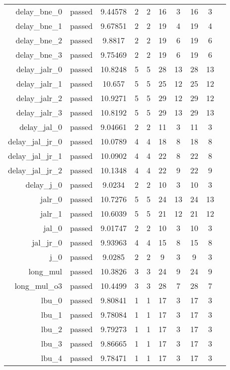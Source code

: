 \begin{longtable}{r|ccccccccc}
    delay\_bne\_0 & passed & 9.44578 & 2 & 2 & 16 & 3 & 16 & 3 \\
    delay\_bne\_1 & passed & 9.67851 & 2 & 2 & 19 & 4 & 19 & 4 \\
    delay\_bne\_2 & passed & 9.8817 & 2 & 2 & 19 & 6 & 19 & 6 \\
    delay\_bne\_3 & passed & 9.75469 & 2 & 2 & 19 & 6 & 19 & 6 \\
    delay\_jalr\_0 & passed & 10.8248 & 5 & 5 & 28 & 13 & 28 & 13 \\
    delay\_jalr\_1 & passed & 10.657 & 5 & 5 & 25 & 12 & 25 & 12 \\
    delay\_jalr\_2 & passed & 10.9271 & 5 & 5 & 29 & 12 & 29 & 12 \\
    delay\_jalr\_3 & passed & 10.8192 & 5 & 5 & 29 & 13 & 29 & 13 \\
    delay\_jal\_0 & passed & 9.04661 & 2 & 2 & 11 & 3 & 11 & 3 \\
    delay\_jal\_jr\_0 & passed & 10.0789 & 4 & 4 & 18 & 8 & 18 & 8 \\
    delay\_jal\_jr\_1 & passed & 10.0902 & 4 & 4 & 22 & 8 & 22 & 8 \\
    delay\_jal\_jr\_2 & passed & 10.1348 & 4 & 4 & 22 & 9 & 22 & 9 \\
    delay\_j\_0 & passed & 9.0234 & 2 & 2 & 10 & 3 & 10 & 3 \\
    jalr\_0 & passed & 10.7276 & 5 & 5 & 24 & 13 & 24 & 13 \\
    jalr\_1 & passed & 10.6039 & 5 & 5 & 21 & 12 & 21 & 12 \\
    jal\_0 & passed & 9.01747 & 2 & 2 & 10 & 3 & 10 & 3 \\
    jal\_jr\_0 & passed & 9.93963 & 4 & 4 & 15 & 8 & 15 & 8 \\
    j\_0 & passed & 9.0285 & 2 & 2 & 9 & 3 & 9 & 3 \\
    long\_mul & passed & 10.3826 & 3 & 3 & 24 & 9 & 24 & 9 \\
    long\_mul\_o3 & passed & 10.4499 & 3 & 3 & 28 & 7 & 28 & 7 \\
    lbu\_0 & passed & 9.80841 & 1 & 1 & 17 & 3 & 17 & 3 \\
    lbu\_1 & passed & 9.78084 & 1 & 1 & 17 & 3 & 17 & 3 \\
    lbu\_2 & passed & 9.79273 & 1 & 1 & 17 & 3 & 17 & 3 \\
    lbu\_3 & passed & 9.86665 & 1 & 1 & 17 & 3 & 17 & 3 \\
    lbu\_4 & passed & 9.78471 & 1 & 1 & 17 & 3 & 17 & 3 \\

\end{longtable}
